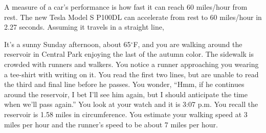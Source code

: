 \documentclass[12pt]{exam}
\begin{document}
\begin{questions}

\question
A measure of a car's performance is how fast it can reach 60 miles/hour from rest. The new Tesla Model S P100DL can accelerate from rest to 60 miles/hour in 2.27 seconds. Assuming it travels in a straight line,


\question It's a sunny Sunday afternoon, about 65$^{\circ}$F, and you are walking around the reservoir in Central Park enjoying the last of the autumn color. The sidewalk is crowded with runners and walkers. You notice a runner approaching you wearing a tee-shirt with writing on it. You read the first two lines, but are unable to read the third and final line before he passes. You wonder, ``Hmm, if he continues around the reservoir, I bet I'll see him again, but I should anticipate the time when we'll pass again.'' You look at your watch and it is 3:07 p.m. You recall the reservoir is 1.58 miles in circumference. You estimate your walking speed at 3 miles per hour and the runner's speed to be about 7 miles per hour.

\end{questions}
\end{document}
